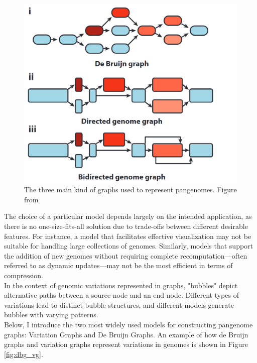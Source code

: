 \begin{figure}[h!]
	\centering
	\includegraphics[width=.75\linewidth]{figures/background/graph_types.png}
	\caption[Graph pangenome models.]{The three main kind of graphs used to represent pangenomes. Figure from~\cite{eizenga}}
	\label{fig:graph_types.png}
\end{figure}
The choice of a particular model depends largely on the intended application, as there is no one-size-fits-all solution due to trade-offs between different desirable features. For instance, a model that facilitates effective visualization may not be suitable for handling large collections of genomes. Similarly, models that support the addition of new genomes without requiring complete recomputation—often referred to as dynamic updates—may not be the most efficient in terms of compression.\\
In the context of genomic variations represented in graphs, "bubbles" depict alternative paths between a source node and an end node. Different types of variations lead to distinct bubble structures, and different models generate bubbles with varying patterns.\\
Below, I introduce the two most widely used models for constructing pangenome graphs: Variation Graphs and De Bruijn Graphs. An example of how de Bruijn graphs and variation graphs represent variations in genomes is shown in Figure \ref{fig:dbg_vg}.\\


